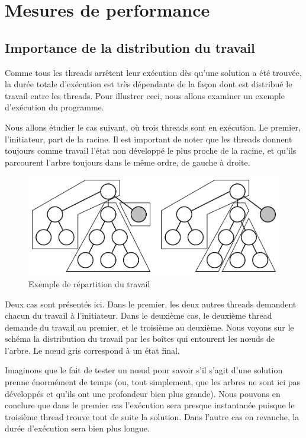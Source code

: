 \documentclass[a4paper,11pt]{report}
\begin{document}
\chapter{Mesures de performance}

\section{Importance de la distribution du travail}

Comme tous les threads arrêtent leur exécution dès qu'une solution a été
trouvée, la durée totale d'exécution est très dépendante de la façon dont est
distribué le travail entre les threads. Pour illustrer ceci, nous allons
examiner un exemple d'exécution du programme.

Nous allons étudier le cas suivant, où trois threads sont en exécution. Le
premier, l'initiateur, part de la racine. Il est important de noter que les
threads donnent toujours comme travail l'état non développé le plus proche de
la racine, et qu'ils parcourent l'arbre toujours dans le même ordre, de gauche
à droite.

\begin{figure}[!htb]
  \centering\bigskip\noindent
  \includegraphics[keepaspectratio,width=.9\textwidth]{schemas/tree}
  \caption{Exemple de répartition du travail}
\end{figure}

\bigskip
Deux cas sont présentés ici. Dans le premier, les deux autres threads
demandent chacun du travail à l'initiateur. Dans le deuxième cas, le deuxième
thread demande du travail au premier, et le troisième au deuxième. Nous voyons
sur le schéma la distribution du travail par les \og boîtes\fg{} qui entourent
les n\oe uds de l'arbre. Le n\oe ud gris correspond à un état final.

Imaginons que le fait de tester un n\oe ud pour savoir s'il s'agit d'une
solution prenne énormément de temps (ou, tout simplement, que les arbres ne
sont ici pas développés et qu'ils ont une profondeur bien plus grande). Nous
pouvons en conclure que dans le premier cas l'exécution sera presque
instantanée puisque le troisième thread trouve tout de suite la solution.
Dans l'autre cas en revanche, la durée d'exécution sera bien plus longue.
\end{document}
